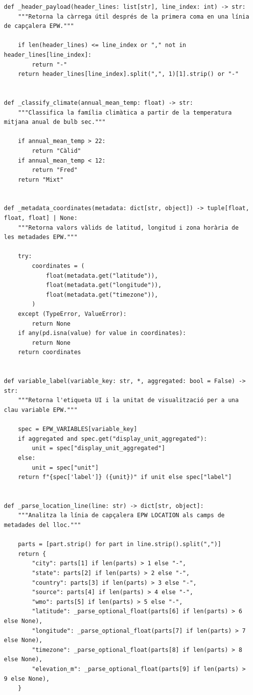 \documentclass[10pt,a4paper]{article}
\begin{document}
\begin{lstlisting}[style=studioPython,caption={backend/visor\_epw\_backend.py},label={lst:backend-visor-epw-backend-py}]
def _header_payload(header_lines: list[str], line_index: int) -> str:
    """Retorna la càrrega útil després de la primera coma en una línia de capçalera EPW."""

    if len(header_lines) <= line_index or "," not in header_lines[line_index]:
        return "-"
    return header_lines[line_index].split(",", 1)[1].strip() or "-"


def _classify_climate(annual_mean_temp: float) -> str:
    """Classifica la família climàtica a partir de la temperatura mitjana anual de bulb sec."""

    if annual_mean_temp > 22:
        return "Càlid"
    if annual_mean_temp < 12:
        return "Fred"
    return "Mixt"


def _metadata_coordinates(metadata: dict[str, object]) -> tuple[float, float, float] | None:
    """Retorna valors vàlids de latitud, longitud i zona horària de les metadades EPW."""

    try:
        coordinates = (
            float(metadata.get("latitude")),
            float(metadata.get("longitude")),
            float(metadata.get("timezone")),
        )
    except (TypeError, ValueError):
        return None
    if any(pd.isna(value) for value in coordinates):
        return None
    return coordinates


def variable_label(variable_key: str, *, aggregated: bool = False) -> str:
    """Retorna l'etiqueta UI i la unitat de visualització per a una clau variable EPW."""

    spec = EPW_VARIABLES[variable_key]
    if aggregated and spec.get("display_unit_aggregated"):
        unit = spec["display_unit_aggregated"]
    else:
        unit = spec["unit"]
    return f"{spec['label']} ({unit})" if unit else spec["label"]


def _parse_location_line(line: str) -> dict[str, object]:
    """Analitza la línia de capçalera EPW LOCATION als camps de metadades del lloc."""

    parts = [part.strip() for part in line.strip().split(",")]
    return {
        "city": parts[1] if len(parts) > 1 else "-",
        "state": parts[2] if len(parts) > 2 else "-",
        "country": parts[3] if len(parts) > 3 else "-",
        "source": parts[4] if len(parts) > 4 else "-",
        "wmo": parts[5] if len(parts) > 5 else "-",
        "latitude": _parse_optional_float(parts[6] if len(parts) > 6 else None),
        "longitude": _parse_optional_float(parts[7] if len(parts) > 7 else None),
        "timezone": _parse_optional_float(parts[8] if len(parts) > 8 else None),
        "elevation_m": _parse_optional_float(parts[9] if len(parts) > 9 else None),
    }



\end{lstlisting}
\end{document}
